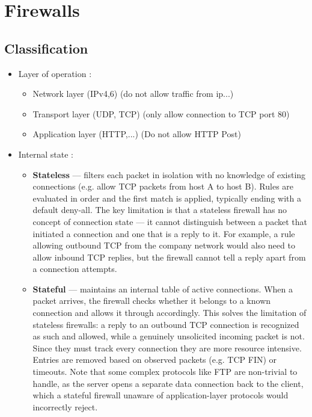 \section{Firewalls}
\subsection{Classification}
\begin{itemize}
    \item Layer of operation : 
    \begin{itemize}
        \item Network layer (IPv4,6) (do not allow traffic from ip...)
        \item Transport layer (UDP, TCP) (only allow connection to TCP port 80)
        \item Application layer (HTTP,...) (Do not allow HTTP Post)
    \end{itemize}
    \item Internal state :
    \begin{itemize}
        \item \textbf{Stateless} — filters each packet in isolation with no knowledge of existing connections (e.g. allow TCP packets from host A to host B). Rules are evaluated in order and the first match is applied, typically ending with a default deny-all. The key limitation is that a stateless firewall has no concept of connection state — it cannot distinguish between a packet that initiated a connection and one that is a reply to it. For example, a rule allowing outbound TCP from the company network would also need to allow inbound TCP replies, but the firewall cannot tell a reply apart from a connection attempts.
        \item \textbf{Stateful} — maintains an internal table of active connections. When a packet arrives, the firewall checks whether it belongs to a known connection and allows it through accordingly. This solves the limitation of stateless firewalls: a reply to an outbound TCP connection is recognized as such and allowed, while a genuinely unsolicited incoming packet is not. Since they must track every connection they are more resource intensive. Entries are removed based on observed packets (e.g. TCP FIN) or timeouts. Note that some complex protocols like FTP are non-trivial to handle, as the server opens a separate data connection back to the client, which a stateful firewall unaware of application-layer protocols would incorrectly reject.    
    \end{itemize}
\end{itemize}

